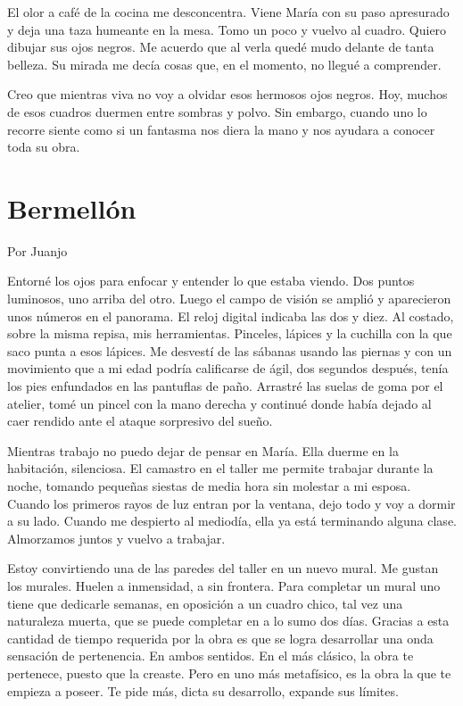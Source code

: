 \documentclass[11pt,twoside,openright,a5paper]{book}
\begin{document}
El olor a café de la cocina me desconcentra. Viene María con su paso apresurado y deja una taza humeante en la mesa. Tomo un poco y vuelvo al cuadro. Quiero dibujar sus ojos negros. Me acuerdo que al verla quedé mudo delante de tanta belleza. Su mirada me decía cosas que, en el momento, no llegué a comprender. 

Creo que mientras viva no voy a olvidar esos hermosos ojos negros.
Hoy, muchos de esos cuadros duermen entre sombras y polvo. Sin embargo, cuando uno lo recorre siente como si un fantasma nos diera la mano y nos ayudara a conocer toda su obra.

\section*{Bermellón}
                                                                                                        \begin{flushright}Por Juanjo\end{flushright}

Entorné los ojos para enfocar y entender lo que estaba viendo. Dos puntos luminosos, uno arriba del otro. Luego el campo de visión se amplió y aparecieron unos números en el panorama. El reloj digital indicaba las dos y diez. Al costado, sobre la misma repisa, mis herramientas. Pinceles, lápices y la cuchilla con la que saco punta a esos lápices. Me desvestí de las sábanas usando las piernas y con un movimiento que a mi edad podría calificarse de ágil, dos segundos después, tenía los pies enfundados en las pantuflas de paño. Arrastré las suelas de goma por el atelier, tomé un pincel con la mano derecha y continué donde había dejado al caer rendido ante el ataque sorpresivo del sueño.

Mientras trabajo no puedo dejar de pensar en María. Ella duerme en la habitación, silenciosa. El camastro en el taller me permite trabajar durante la noche, tomando pequeñas siestas de media hora sin molestar a mi esposa. Cuando los primeros rayos de luz entran por la ventana, dejo todo y voy a dormir a su lado. Cuando me despierto al mediodía, ella ya está terminando alguna clase. Almorzamos juntos y vuelvo a trabajar.

Estoy convirtiendo una de las paredes del taller en un nuevo mural. Me gustan los murales. Huelen a inmensidad, a sin frontera. Para completar un mural uno tiene que dedicarle semanas, en oposición a un cuadro chico, tal vez una naturaleza muerta, que se puede completar en a lo sumo dos días. Gracias a esta cantidad de tiempo requerida por la obra es que se logra desarrollar una onda sensación de pertenencia. En ambos sentidos. En el más clásico, la obra te pertenece, puesto que la creaste. Pero en uno más metafísico, es la obra la que te empieza a poseer. Te  pide más, dicta su desarrollo, expande sus límites. 
\end{document}
